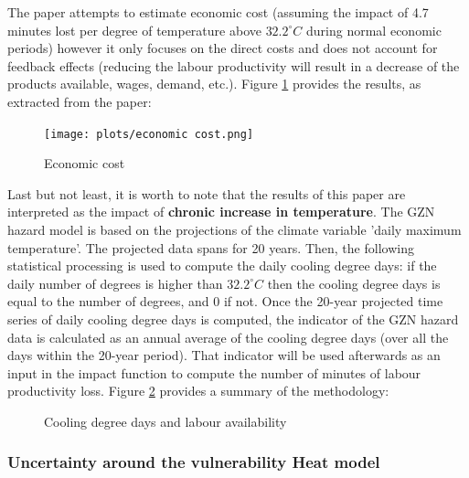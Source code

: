 \documentclass[a4paper,11pt]{extarticle} %
\begin{document}
The paper attempts to estimate economic cost (assuming the impact of 4.7 minutes lost per degree of temperature above $32.2^\circ C$ during normal economic periods) however it only focuses on the direct costs and does not account for feedback effects (reducing the labour productivity will result in a decrease of the products available, wages, demand, etc.). Figure \ref{fig:economiccost} provides the results, as extracted from the paper:
\begin{figure}[h]
    \centering
    \texttt{[image: plots/economic cost.png]}
    \caption{Economic cost}
    \label{fig:economiccost}
\end{figure}

Last but not least, it is worth to note that the results of this paper are interpreted as the impact of \textbf{chronic increase in temperature}.
The GZN hazard  model is based on the projections of the climate variable 'daily maximum temperature'. The projected data spans for 20 years. Then, the following statistical processing is used to compute the daily cooling degree days: if the daily number of degrees is higher than $32.2^\circ C$ then the cooling degree days is equal to the number of degrees, and 0 if not. Once the 20-year projected time series of daily cooling degree days is computed, the indicator of the GZN hazard data is calculated as an annual average of the cooling degree days (over all the days within the 20-year period). That indicator will be used afterwards as an input in the impact function to compute the number of minutes of labour productivity loss. Figure \ref{fig:GZL-Hazard} provides a summary of the methodology:

\begin{figure}[h]
    \centering
    \caption{Cooling degree days and labour availability}
    \label{fig:GZL-Hazard}
\end{figure}


\subsubsection{Uncertainty around the vulnerability Heat model}
\end{document}
